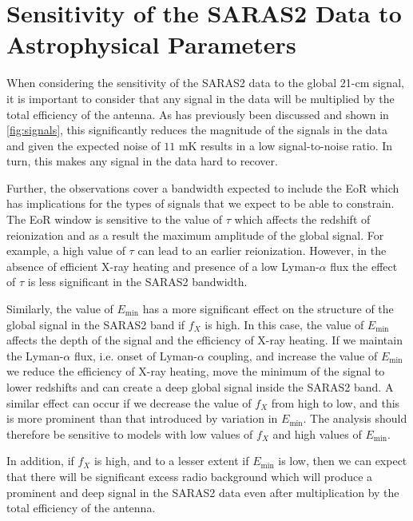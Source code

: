 \section{Sensitivity of the SARAS2 Data to Astrophysical Parameters}
\label{sec:sensitivity}

When considering the sensitivity of the SARAS2 data to the global 21-cm signal, it is important to consider that any signal in the data will be multiplied by the total efficiency of the antenna. As has previously been discussed and shown in \cref{fig:signals}, this significantly reduces the magnitude of the signals in the data and given the expected noise of $11$ mK results in a low signal-to-noise ratio. In turn, this makes any signal in the data hard to recover.

Further, the observations cover a bandwidth expected to include the EoR which has implications for the types of signals that we expect to be able to constrain. The EoR window is sensitive to the value of $\tau$ which affects the redshift of reionization and as a result the maximum amplitude of the global signal. For example, a high value of $\tau$ can lead to an earlier reionization. However, in the absence of efficient X-ray heating and presence of a low Lyman-$\alpha$ flux the effect of $\tau$ is less significant in the SARAS2 bandwidth.

Similarly, the value of $E_\mathrm{min}$ has a more significant effect on the structure of the global signal in the SARAS2 band if $f_X$ is high. In this case, the value of $E_\mathrm{min}$ affects the depth of the signal and the efficiency of X-ray heating. If we maintain the Lyman-$\alpha$ flux, i.e. onset of Lyman-$\alpha$ coupling, and increase the value of $E_\mathrm{min}$ we reduce the efficiency of X-ray heating, move the minimum of the signal to lower redshifts and can create a deep global signal inside the SARAS2 band. A similar effect can occur if we decrease the value of $f_X$ from high to low, and this is more prominent than that introduced by variation in $E_\mathrm{min}$. The analysis should therefore be sensitive to models with low values of $f_X$ and high values of $E_\mathrm{min}$.

In addition, if $f_X$ is high, and to a lesser extent if $E_\mathrm{min}$ is low, then we can expect that there will be significant excess radio background which will produce a prominent and deep signal in the SARAS2 data even after multiplication by the total efficiency of the antenna.


